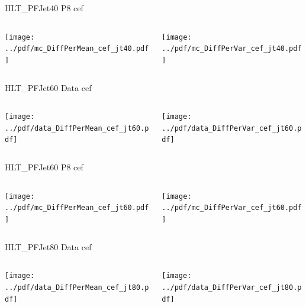 \documentclass[9pt]{beamer}
\begin{document}
\begin{frame}[t]{HLT\_PFJet40 P8 cef}
\begin{columns}[T]
  \begin{column}{.5\textwidth}
  \texttt{[image: ../pdf/mc\_DiffPerMean\_cef\_jt40.pdf]}
  \end{column}
  \begin{column}{.5\textwidth}
  \texttt{[image: ../pdf/mc\_DiffPerVar\_cef\_jt40.pdf]}
  \end{column}
\end{columns}
\end{frame}

\begin{frame}[t]{HLT\_PFJet60 Data cef}
\begin{columns}[T]
  \begin{column}{.5\textwidth}
  \texttt{[image: ../pdf/data\_DiffPerMean\_cef\_jt60.pdf]}
  \end{column}
  \begin{column}{.5\textwidth}
  \texttt{[image: ../pdf/data\_DiffPerVar\_cef\_jt60.pdf]}
  \end{column}
\end{columns}
\end{frame}

\begin{frame}[t]{HLT\_PFJet60 P8 cef}
\begin{columns}[T]
  \begin{column}{.5\textwidth}
  \texttt{[image: ../pdf/mc\_DiffPerMean\_cef\_jt60.pdf]}
  \end{column}
  \begin{column}{.5\textwidth}
  \texttt{[image: ../pdf/mc\_DiffPerVar\_cef\_jt60.pdf]}
  \end{column}
\end{columns}
\end{frame}

\begin{frame}[t]{HLT\_PFJet80 Data cef}
\begin{columns}[T]
  \begin{column}{.5\textwidth}
  \texttt{[image: ../pdf/data\_DiffPerMean\_cef\_jt80.pdf]}
  \end{column}
  \begin{column}{.5\textwidth}
  \texttt{[image: ../pdf/data\_DiffPerVar\_cef\_jt80.pdf]}
  \end{column}
\end{columns}
\end{frame}
\end{document}
